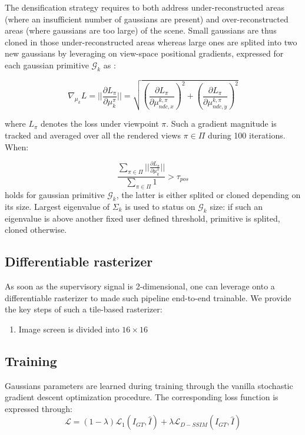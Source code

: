 The densification strategy requires to both address under-reconstructed areas (where an insufficient number of gaussians are present) and over-reconstructed areas (where gaussians are too large) of the scene. Small gaussians are thus cloned in those under-reconstructed areas whereas large ones are splited into two new gaussians by leveraging on view-space positional gradients, expressed for each gaussian primitive $\mathcal{G}_{k}$ as : 

\begin{equation}
   \nabla_{\mu_{k}}L= ||\frac{\partial L_{\pi}}{\partial \mu_{k}^{\pi}}|| = \sqrt{\left(\frac{\partial L_{\pi}}{\partial \mu_{ndc,x}^{k,\pi}}\right)^{2} + \left(\frac{\partial L_{\pi}}{\partial \mu_{ndc,y}^{k,\pi}}\right)^{2}}
\end{equation}

where $L_{\pi}$ denotes the loss under viewpoint $\pi$. Such a gradient magnitude is tracked and averaged over all the rendered views $\pi \in \Pi$ during 100 iterations. When: 

\begin{equation}
\frac{\sum \limits_{\pi \in \Pi} ||\frac{\partial L_{\pi}}{\partial \mu_{k}^{\pi}}||}{\sum \limits_{\pi \in \Pi} 1} > \tau_{pos}
\label{eq:adc-original}
\end{equation}
holds for gaussian primitive $\mathcal{G}_{k}$, the latter is either splited or cloned depending on its size. Largest eigenvalue of $\Sigma_{k}$ is used to status on $\mathcal{G}_{k}$ size: if such an eigenvalue is above another fixed user defined threshold, primitive is splited, cloned otherwise. \newline

\subsection{Differentiable rasterizer} As soon as the supervisory signal is 2-dimensional, one can leverage onto a differentiable rasterizer to made such pipeline end-to-end trainable. We provide the key steps of such a tile-based rasterizer: 

\begin{enumerate}
    \item Image screen is divided into $16\times 16$ 
\end{enumerate}

\subsection{Training} 
Gaussians parameters are learned during training through the vanilla stochastic gradient descent optimization procedure. The corresponding loss function is expressed through: 
\begin{equation}
    \mathcal{L} = (1-\lambda)\mathcal{L}_{1}(I_{GT},\hat{I}) + \lambda \mathcal{L}_{D-SSIM}(I_{GT},\hat{I})
\end{equation}

